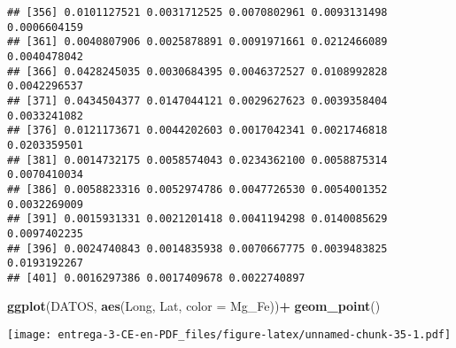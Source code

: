 \documentclass[
]{article}
\newenvironment{Shaded}{\begin{snugshade}}{\end{snugshade}}
\newcommand{\DataTypeTok}[1]{\textcolor[rgb]{0.13,0.29,0.53}{#1}}
\newcommand{\DecValTok}[1]{\textcolor[rgb]{0.00,0.00,0.81}{#1}}
\newcommand{\KeywordTok}[1]{\textcolor[rgb]{0.13,0.29,0.53}{\textbf{#1}}}
\newcommand{\NormalTok}[1]{#1}
\newcommand{\OperatorTok}[1]{\textcolor[rgb]{0.81,0.36,0.00}{\textbf{#1}}}
\newcommand{\StringTok}[1]{\textcolor[rgb]{0.31,0.60,0.02}{#1}}
\begin{document}
\begin{verbatim}
## [356] 0.0101127521 0.0031712525 0.0070802961 0.0093131498 0.0006604159
## [361] 0.0040807906 0.0025878891 0.0091971661 0.0212466089 0.0040478042
## [366] 0.0428245035 0.0030684395 0.0046372527 0.0108992828 0.0042296537
## [371] 0.0434504377 0.0147044121 0.0029627623 0.0039358404 0.0033241082
## [376] 0.0121173671 0.0044202603 0.0017042341 0.0021746818 0.0203359501
## [381] 0.0014732175 0.0058574043 0.0234362100 0.0058875314 0.0070410034
## [386] 0.0058823316 0.0052974786 0.0047726530 0.0054001352 0.0032269009
## [391] 0.0015931331 0.0021201418 0.0041194298 0.0140085629 0.0097402235
## [396] 0.0024740843 0.0014835938 0.0070667775 0.0039483825 0.0193192267
## [401] 0.0016297386 0.0017409678 0.0022740897
\end{verbatim}

\begin{Shaded}
\begin{Highlighting}[]
\KeywordTok{ggplot}\NormalTok{(DATOS, }\KeywordTok{aes}\NormalTok{(Long, Lat, }\DataTypeTok{color =}\NormalTok{ Mg_Fe))}\OperatorTok{+}
\StringTok{  }\KeywordTok{geom_point}\NormalTok{()}
\end{Highlighting}
\end{Shaded}

\texttt{[image: entrega-3-CE-en-PDF\_files/figure-latex/unnamed-chunk-35-1.pdf]}

\begin{Shaded}
\end{Shaded}
\end{document}
